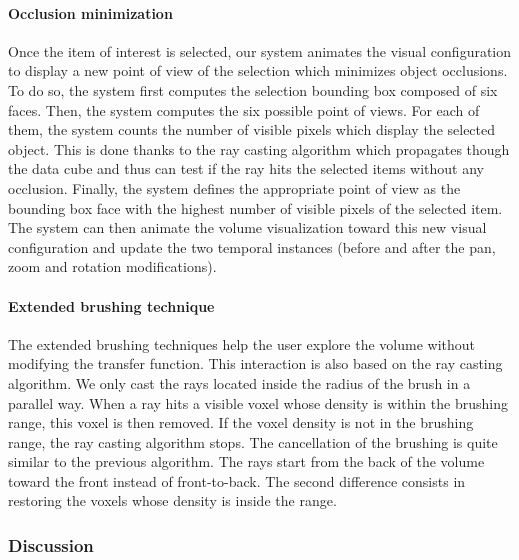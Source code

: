 \paragraph{Occlusion minimization}

Once the item of interest is selected, our system animates the visual configuration to display a new point of view of the selection which minimizes object occlusions. To do so, the system first computes the selection bounding box composed of six faces. Then, the system computes the six possible point of views. For each of them, the system counts the number of visible pixels which display the selected object. This is done thanks to the ray casting algorithm which propagates though the data cube and thus can test if the ray hits the selected items without any occlusion. Finally, the system defines the appropriate point of view as the bounding box face with the highest number of visible pixels of the selected item.
The system can then animate the volume visualization toward this new visual configuration and update the two temporal instances (before and after the pan, zoom and rotation modifications).

\paragraph{Extended brushing technique}

The extended brushing techniques help the user explore the volume without modifying the transfer function. This interaction is also based on the ray casting algorithm. We only cast the rays located inside the radius of the brush in a parallel way.
When a ray hits a visible voxel whose density is within the brushing range, this voxel is then removed. If the voxel density is not in the brushing range, the ray casting algorithm stops.
The cancellation of the brushing is quite similar to the previous algorithm. The rays start from the back of the volume toward the front instead of front-to-back. The second difference consists in restoring the voxels whose density is inside the range.

\subsubsection{Discussion}

